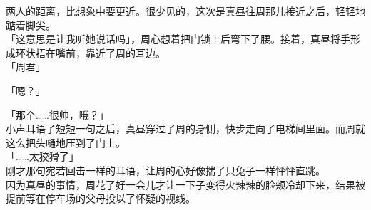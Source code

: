 两人的距离，比想象中要更近。很少见的，这次是真昼往周那儿接近之后，轻轻地踮着脚尖。\\

「这意思是让我听她说话吗」，周心想着把门锁上后弯下了腰。接着，真昼将手形成环状捂在嘴前，靠近了周的耳边。\\

「周君」

「嗯？」

「那个……很帅，哦？」\\

小声耳语了短短一句之后，真昼穿过了周的身侧，快步走向了电梯间里面。而周就这么把头嗵地压到了门上。\\

「……太狡猾了」\\

刚才那句宛若回击一样的耳语，让周的心好像揣了只兔子一样怦怦直跳。\\

因为真昼的事情，周花了好一会儿才让一下子变得火辣辣的脸颊冷却下来，结果被提前等在停车场的父母投以了怀疑的视线。
